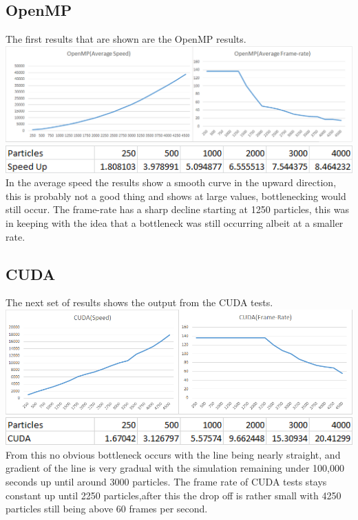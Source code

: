 \documentclass[12pt]{article}
\begin{document}
\subsection{OpenMP}
The first results that are shown are the OpenMP results.
\newline
\includegraphics[scale=0.5]{pics/optest.png}
\newline
\includegraphics[scale=0.7]{pics/opspeedup.png}
\newline
 In the average speed the results show a smooth curve in the upward direction, this is probably not a good thing and shows at large values, bottlenecking would still occur.
 \newline
 The frame-rate has a sharp decline starting at 1250 particles, this was in keeping with the idea that a bottleneck was still occurring albeit at a smaller rate.
\subsection{CUDA}
The next set of results shows the output from the CUDA tests.
\newline
\includegraphics[scale=0.5]{pics/cudatest.png}
\newline
\includegraphics[scale=0.7]{pics/cudaspeedup.png}
\newline
From this no obvious bottleneck occurs with the line being nearly straight, and gradient of the line is very gradual with the simulation remaining under 100,000 seconds up until around 3000 particles.
\newline
The frame rate of CUDA tests stays constant up until 2250 particles,after this the drop off is rather small with 4250 particles still being above 60 frames per second. 
\end{document}
